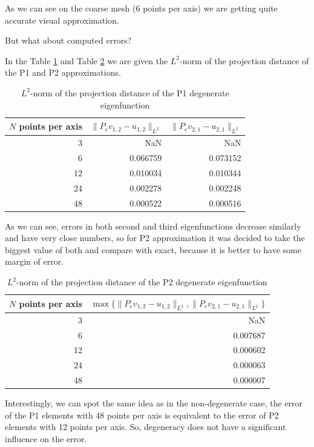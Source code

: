 \documentclass[conference]{IEEEtran}
\begin{document}
As we can see on the coarse mesh (6 points per axis) we are getting quite accurate visual approximation.

But what about computed errors?

In the Table \ref{tab:projection errors P1} and Table \ref{tab:projection errors P2} we are given the $L^2$-norm of the projection distance of the P1 and P2 approximations.
\begin{table}[H]
    \centering
    \caption{$L^2$-norm of the projection distance of the P1 degenerate eigenfunction}
    \label{tab:projection errors P1}
    \begin{tabular}{rrr}
        \toprule
        $N$ points per axis & $\|P_ev_{1,2} - u_{1,2}\|_{L^2}$ & $\|P_ev_{2,1} - u_{2,1}\|_{L^2}$ \\
        \midrule
        3 & NaN & NaN \\
        6 & 0.066759 & 0.073152 \\
        12 & 0.010034 & 0.010344 \\
        24 & 0.002278 & 0.002248 \\
        48 & 0.000522 & 0.000516 \\
        \bottomrule
    \end{tabular}
\end{table}
As we can see, errors in both second and third eigenfunctions decrease similarly and have very close numbers, so for P2 approximation it was decided to take the biggest value of both and compare with exact, because it is better to have some margin of error. 
\begin{table}[H]
    \centering
    \caption{$L^2$-norm of the projection distance of the P2 degenerate eigenfunction}
    \label{tab:projection errors P2}
    \begin{tabular}{rr}
        \toprule
        $N$ points per axis & $\max\{\|P_ev_{1,2} - u_{1,2}\|_{L^2}, \|P_ev_{2,1} - u_{2,1}\|_{L^2}\}$ \\
        \midrule
        3 & NaN \\
        6 & 0.007687 \\
        12 & 0.000602 \\
        24 & 0.000063 \\
        48 & 0.000007 \\
        \bottomrule
    \end{tabular}
\end{table}

Interestingly, we can spot the same idea as in the non-degenerate case, the error of the P1 elements with 48 points per axis is equivalent to the error of P2 elements with 12 points per axis. 
So, degeneracy does not have a significant influence on the error.
\end{document}
